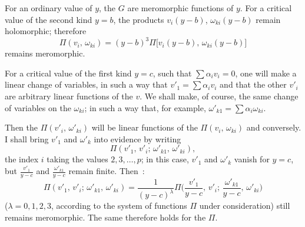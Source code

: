 \documentclass{article}
\begin{document}
For an ordinary value of $y$, the $G$ are meromorphic functions of $y$.
For a critical value of the second kind $y = b$, the products $v_{i}(y - b)$, $\omega_{ki}(y - b)$ remain holomorphic; therefore
\[
\Pi(v_{i},\, \omega_{ki}) = (y - b)^{3} \Pi\bigl[ v_{i}(y - b),\, \omega_{ki}(y - b) \bigr]
\]
remains meromorphic.

For a critical value of the first kind $y = c$, such that $\displaystyle\sum \alpha_{i} v_{i} = 0$, one will make a linear change of variables, in such a way that $v'_{1} = \displaystyle\sum \alpha_{i} v_{i}$ and that the other $v'_{i}$ are arbitrary linear functions of the $v$. We shall make, of course, the same change of variables on the $\omega_{ki}$; in such a way that, for example, $\omega'_{k1} = \displaystyle\sum \alpha_{i} \omega_{ki}$.

Then the $\Pi(v'_{i},\, \omega'_{ki})$ will be linear functions of the $\Pi(v_{i},\, \omega_{ki})$ and conversely. I shall bring $v'_{1}$ and $\omega'_{k}$ into evidence by writing
\[
\Pi(v'_{1},\, v'_{i};\, \omega'_{k1},\, \omega'_{ki}),
\]
the index $i$ taking the values $2, 3, \ldots, p$; in this case, $v'_{1}$ and $\omega'_{k}$ vanish for $y = c$, but $\frac{v'_{1}}{y - c}$ and $\frac{\omega'_{k1}}{y - c}$ remain finite. Then~:
\[
\Pi(v'_{1},\, v'_{i};\, \omega'_{k1},\, \omega'_{ki}) = \frac{1}{(y - c)^{\lambda}} \Pi\biggl( \frac{v'_{1}}{y - c},\, v'_{i};\, \frac{\omega'_{k1}}{y - c},\, \omega'_{ki} \biggr)
\]
($\lambda = 0, 1, 2, 3$, according to the system of functions $\Pi$ under consideration) still remains meromorphic. The same therefore holds for the $\Pi$.
\end{document}
